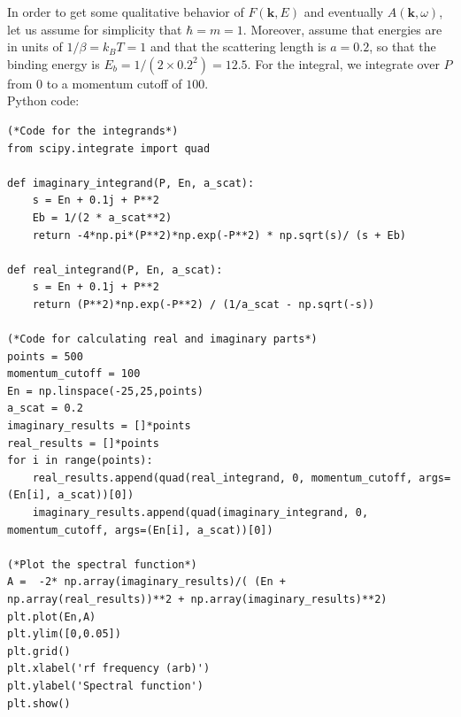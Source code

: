 \documentclass{article}
\theoremstyle{definition}
\begin{document}
\noindent In order to get some qualitative behavior of $F(\mathbf{k}, E)$ and eventually $A(\mathbf{k}, \omega)$, let us assume for simplicity that $\hbar = m = 1$. Moreover, assume that energies are in units of $1/\beta = k_B T = 1$ and that the scattering length is $a = 0.2$, so that the binding energy is $E_b = 1/(2 \times 0.2^2) = 12.5$. For the integral, we integrate over $P$ from 0 to a momentum cutoff of $100$.  \\

\noindent Python code: 
\begin{lstlisting}
(*Code for the integrands*)
from scipy.integrate import quad

def imaginary_integrand(P, En, a_scat):
    s = En + 0.1j + P**2
    Eb = 1/(2 * a_scat**2)
    return -4*np.pi*(P**2)*np.exp(-P**2) * np.sqrt(s)/ (s + Eb)

def real_integrand(P, En, a_scat):
    s = En + 0.1j + P**2
    return (P**2)*np.exp(-P**2) / (1/a_scat - np.sqrt(-s))
    
(*Code for calculating real and imaginary parts*)
points = 500
momentum_cutoff = 100
En = np.linspace(-25,25,points)
a_scat = 0.2
imaginary_results = []*points
real_results = []*points
for i in range(points):
    real_results.append(quad(real_integrand, 0, momentum_cutoff, args=(En[i], a_scat))[0])
    imaginary_results.append(quad(imaginary_integrand, 0, momentum_cutoff, args=(En[i], a_scat))[0])
    
(*Plot the spectral function*)
A =  -2* np.array(imaginary_results)/( (En + np.array(real_results))**2 + np.array(imaginary_results)**2)
plt.plot(En,A)
plt.ylim([0,0.05])
plt.grid()
plt.xlabel('rf frequency (arb)')
plt.ylabel('Spectral function')
plt.show()
\end{lstlisting}
\end{document}
